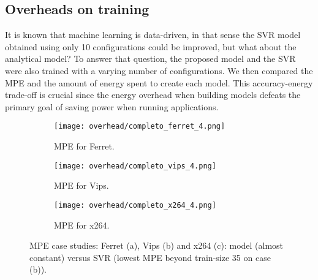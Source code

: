 \documentclass{ieeeaccess}
\begin{document}
\subsection{Overheads on training} \label{sec:overhead}
It is known that machine learning is data-driven, in that sense the SVR model obtained using only 10 configurations could be improved, but what about the analytical model? 
To answer that question, the proposed model and the SVR were also trained with a varying  number of configurations.
We then compared the MPE and the amount of energy spent to create each model. 
This accuracy-energy trade-off is crucial since the energy overhead when building models defeats the primary goal of saving power when running applications.


\begin{figure}[H]
    \centering
    \begin{subfigure}[b]{0.45\textwidth}
    	\centerline{\texttt{[image: overhead/completo\_ferret\_4.png]}}
        \caption{MPE for Ferret.}
    	\label{fig:overhead_ferret}
    \end{subfigure}
    \begin{subfigure}[b]{0.45\textwidth}
    	\centerline{\texttt{[image: overhead/completo\_vips\_4.png]}}
        \caption{MPE for Vips.}
    	\label{fig:overhead_vips}
    \end{subfigure}
    \begin{subfigure}[b]{0.45\textwidth}
    	\centerline{\texttt{[image: overhead/completo\_x264\_4.png]}}
        \caption{MPE for x264.}
    	\label{fig:overhead_x264}
    \end{subfigure}
    \caption{MPE case studies: Ferret (a), Vips (b) and x264 (c): model (almost constant) versus SVR (lowest MPE beyond train-size 35 on case (b)).}
    \label{fig:overheadFerretVips}
\end{figure}
\end{document}
